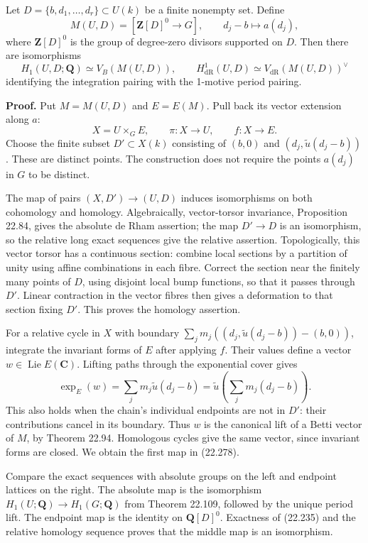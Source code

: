 \documentclass[
  11pt,
  a4paper,
]{article}
\newcounter{none} %
\begin{document}
Let \(D=\{b,d_1,\ldots,d_r\}\subset U(k)\) be a finite nonempty set.
Define \[
 M(U,D)=
 \left[\mathbf Z[D]^0\longrightarrow G\right],
 \qquad d_j-b\longmapsto a(d_j),
 \tag{22.277}
\] where \(\mathbf Z[D]^0\) is the group of degree-zero divisors
supported on \(D\). Then there are isomorphisms \[
 H_1(U,D;\mathbf Q)\simeq V_B(M(U,D)),\qquad
 H^1_{\mathrm{dR}}(U,D)\simeq V_{\mathrm{dR}}(M(U,D))^\vee
 \tag{22.278}
\] identifying the integration pairing with the 1-motive period pairing.

\textbf{Proof.} Put \(M=M(U,D)\) and \(E=E(M)\). Pull back its vector
extension along \(a\): \[
 X=U\times_G E,\qquad \pi:X\to U,\qquad f:X\to E.
 \tag{22.279}
\] Choose the finite subset \(D'\subset X(k)\) consisting of \((b,0)\)
and \((d_j,\widetilde u(d_j-b))\). These are distinct points. The
construction does not require the points \(a(d_j)\) in \(G\) to be
distinct.

The map of pairs \((X,D')\to(U,D)\) induces isomorphisms on both
cohomology and homology. Algebraically, vector-torsor invariance,
Proposition 22.84, gives the absolute de Rham assertion; the map
\(D'\to D\) is an isomorphism, so the relative long exact sequences give
the relative assertion. Topologically, this vector torsor has a
continuous section: combine local sections by a partition of unity using
affine combinations in each fibre. Correct the section near the finitely
many points of \(D\), using disjoint local bump functions, so that it
passes through \(D'\). Linear contraction in the vector fibres then
gives a deformation to that section fixing \(D'\). This proves the
homology assertion.

For a relative cycle in \(X\) with boundary
\(\sum_jm_j((d_j,\widetilde u(d_j-b))-(b,0))\), integrate the invariant
forms of \(E\) after applying \(f\). Their values define a vector
\(w\in\operatorname{Lie}E(\mathbf C)\). Lifting paths through the
exponential cover gives \[
 \exp_E(w)=\sum_jm_j\widetilde u(d_j-b)
           =\widetilde u\!\left(\sum_jm_j(d_j-b)\right).
 \tag{22.280}
\] This also holds when the chain's individual endpoints are not in
\(D'\): their contributions cancel in its boundary. Thus \(w\) is the
canonical lift of a Betti vector of \(M\), by Theorem 22.94. Homologous
cycles give the same vector, since invariant forms are closed. We obtain
the first map in (22.278).

Compare the exact sequences with absolute groups on the left and
endpoint lattices on the right. The absolute map is the isomorphism
\(H_1(U;\mathbf Q)\to H_1(G;\mathbf Q)\) from Theorem 22.109, followed
by the unique period lift. The endpoint map is the identity on
\(\mathbf Q[D]^0\). Exactness of (22.235) and the relative homology
sequence proves that the middle map is an isomorphism.
\end{document}
